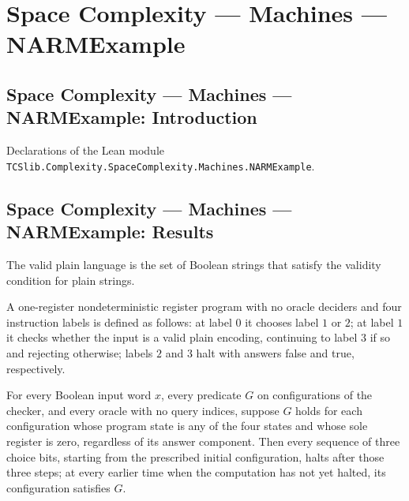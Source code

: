 \section{Space Complexity --- Machines --- NARMExample}
\subsection*{Space Complexity --- Machines --- NARMExample: Introduction}

Declarations of the Lean module \texttt{TCSlib.Complexity.SpaceComplexity.Machines.NARMExample}.

\subsection*{Space Complexity --- Machines --- NARMExample: Results}

\begin{definition}
\label{Complexity.LogProg.validPlainLang}
\leanok
{}
The valid plain language is the set of Boolean strings that satisfy the validity
condition for plain strings.
\end{definition}

\begin{definition}
\label{Complexity.LogProg.guessValidA}
\leanok
{}
A one-register nondeterministic register program with no oracle deciders and four
instruction labels is defined as follows: at label $0$ it chooses label $1$ or $2$; at
label $1$ it checks whether the input is a valid plain encoding, continuing to label $3$
if so and rejecting otherwise; labels $2$ and $3$ halt with answers false and true,
respectively.
\end{definition}

\begin{lemma}
\label{Complexity.LogProg.guessValidA_halts}
\leanok
{}
For every Boolean input word $x$, every predicate $G$ on configurations of the checker,
and every oracle with no query indices, suppose $G$ holds for each configuration whose
program state is any of the four states and whose sole register is zero, regardless of
its answer component. Then every sequence of three choice bits, starting from the
prescribed initial configuration, halts after those three steps; at every earlier time
when the computation has not yet halted, its configuration satisfies $G$.
\end{lemma}

